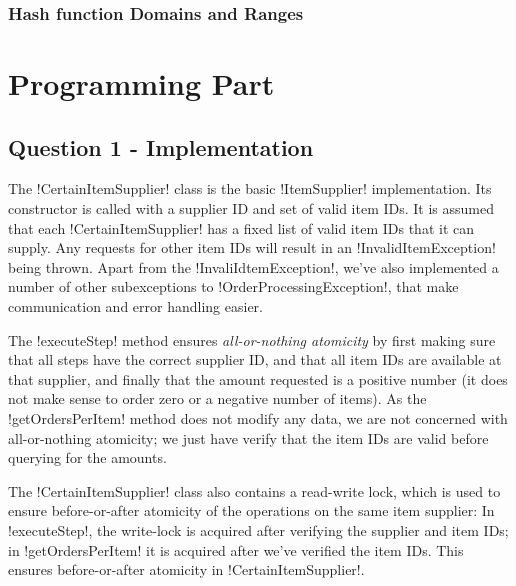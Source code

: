 \documentclass[a4paper, 12pt]{article}
\begin{document}
\subsubsection*{Hash function Domains and Ranges}

\section*{Programming Part}

\subsection*{Question 1 - Implementation}




The !CertainItemSupplier! class is the basic !ItemSupplier!
implementation. Its constructor is called with a supplier ID and set
of valid item IDs. It is assumed that each !CertainItemSupplier! has a
fixed list of valid item IDs that it can supply. Any requests for
other item IDs will result in an !InvalidItemException! being
thrown. Apart from the !InvaliIdtemException!, we've also implemented
a number of other subexceptions to !OrderProcessingException!, that
make communication and error handling easier.

The !executeStep! method ensures \emph{all-or-nothing atomicity} by
first making sure that all steps have the correct supplier ID, and
that all item IDs are available at that supplier, and finally that the
amount requested is a positive number (it does not make sense to order
zero or a negative number of items). As the !getOrdersPerItem! method
does not modify any data, we are not concerned with all-or-nothing
atomicity; we just have verify that the item IDs are valid before
querying for the amounts.

The !CertainItemSupplier! class also contains a read-write lock, which
is used to ensure before-or-after atomicity of the operations on the
same item supplier: In !executeStep!, the write-lock is acquired after
verifying the supplier and item IDs; in !getOrdersPerItem! it is
acquired after we've verified the item IDs. This ensures
before-or-after atomicity in !CertainItemSupplier!.
\end{document}
